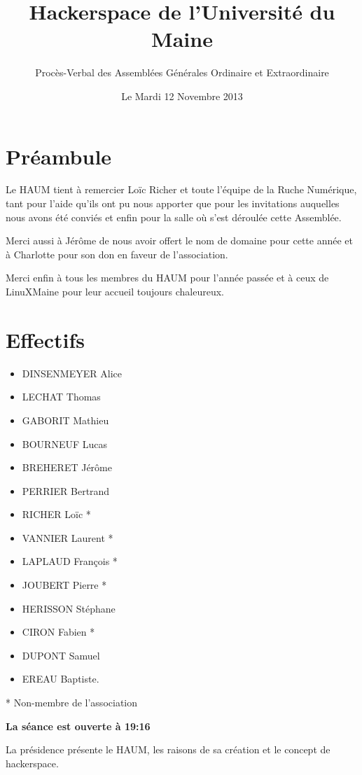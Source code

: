 \documentclass[a4paper, 11pt]{article}
\title{Hackerspace de l'Université du Maine}
\author{Procès-Verbal des Assemblées Générales Ordinaire et Extraordinaire}
\date{Le Mardi 12 Novembre 2013}
\begin{document}
\maketitle

\section*{Préambule}

Le HAUM tient à remercier Loïc Richer et toute l'équipe de la Ruche Numérique, tant pour l'aide qu'ils ont pu nous apporter que pour les invitations auquelles nous avons été conviés et enfin pour la salle où s'est déroulée cette Assemblée.

Merci aussi à Jérôme de nous avoir offert le nom de domaine pour cette année et à Charlotte pour son don en faveur de l'association.

Merci enfin à tous les membres du HAUM pour l'année passée et à ceux de LinuXMaine pour leur accueil toujours chaleureux.

\section{Effectifs}

\begin{itemize}
  \item DINSENMEYER Alice
  \item LECHAT Thomas
  \item GABORIT Mathieu
  \item BOURNEUF Lucas
  \item BREHERET Jérôme
  \item PERRIER Bertrand
  \item RICHER Loïc *
  \item VANNIER Laurent *
  \item LAPLAUD François *
  \item JOUBERT Pierre *
  \item HERISSON Stéphane
  \item CIRON Fabien *
  \item DUPONT Samuel
  \item EREAU Baptiste.
\end{itemize}

* Non-membre de l'association

\textbf{La séance est ouverte à 19:16}

La présidence présente le HAUM, les raisons de sa création et le concept de hackerspace.
\end{document}
